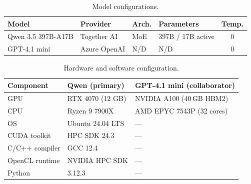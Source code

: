 

\begin{table}[htbp]
\centering
\caption{Model configurations.}
\label{tab:model-config}
\small
\begin{tabular}{@{}llllc@{}}
\toprule
Model & Provider & Arch. & Parameters & Temp. \\
\midrule
Qwen 3.5 397B-A17B & Together AI & MoE & 397B / 17B active & 0 \\
GPT-4.1 mini & Azure OpenAI & N/D & N/D & 0 \\
\bottomrule
\end{tabular}
\end{table}


\begin{table}[htbp]
\centering
\caption{Hardware and software configuration.}
\label{tab:hardware}
\small
\begin{tabular}{@{}lll@{}}
\toprule
Component & Qwen (primary) & GPT-4.1 mini (collaborator) \\
\midrule
GPU & RTX 4070 (12 GB) & NVIDIA A100 (40\,GB HBM2) \\
CPU & Ryzen 9 7900X & AMD EPYC 7543P (32 cores) \\
OS & Ubuntu 24.04 LTS & --- \\
CUDA toolkit & HPC SDK 24.3 & --- \\
C/C++ compiler & GCC 12.4 & --- \\
OpenCL runtime & NVIDIA HPC SDK & --- \\
Python & 3.12.3 & --- \\
\bottomrule
\end{tabular}
\end{table}



